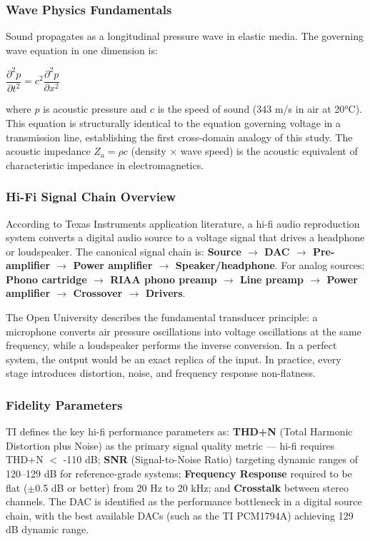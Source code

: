 \documentclass[11pt,letterpaper]{article}
\begin{document}
\subsubsection{Wave Physics Fundamentals}

Sound propagates as a longitudinal pressure wave in elastic media. The governing wave equation in one dimension is:

\begin{center}
$\dfrac{\partial^2 p}{\partial t^2} = c^2 \dfrac{\partial^2 p}{\partial x^2}$
\end{center}

where $p$ is acoustic pressure and $c$ is the speed of sound (343 m/s in air at 20°C). This equation is structurally identical to the equation governing voltage in a transmission line, establishing the first cross-domain analogy of this study. The acoustic impedance $Z_a = \rho c$ (density $\times$ wave speed) is the acoustic equivalent of characteristic impedance in electromagnetics.

\subsubsection{Hi-Fi Signal Chain Overview}

According to Texas Instruments application literature, a hi-fi audio reproduction system converts a digital audio source to a voltage signal that drives a headphone or loudspeaker. The canonical signal chain is: \textbf{Source $\to$ DAC $\to$ Pre-amplifier $\to$ Power amplifier $\to$ Speaker/headphone}. For analog sources: \textbf{Phono cartridge $\to$ RIAA phono preamp $\to$ Line preamp $\to$ Power amplifier $\to$ Crossover $\to$ Drivers}.

The Open University describes the fundamental transducer principle: a microphone converts air pressure oscillations into voltage oscillations at the same frequency, while a loudspeaker performs the inverse conversion. In a perfect system, the output would be an exact replica of the input. In practice, every stage introduces distortion, noise, and frequency response non-flatness.

\subsubsection{Fidelity Parameters}

TI defines the key hi-fi performance parameters as: \textbf{THD+N} (Total Harmonic Distortion plus Noise) as the primary signal quality metric --- hi-fi requires THD+N $<$ -110 dB; \textbf{SNR} (Signal-to-Noise Ratio) targeting dynamic ranges of 120--129 dB for reference-grade systems; \textbf{Frequency Response} required to be flat ($\pm$0.5 dB or better) from 20 Hz to 20 kHz; and \textbf{Crosstalk} between stereo channels. The DAC is identified as the performance bottleneck in a digital source chain, with the best available DACs (such as the TI PCM1794A) achieving 129 dB dynamic range.
\end{document}
